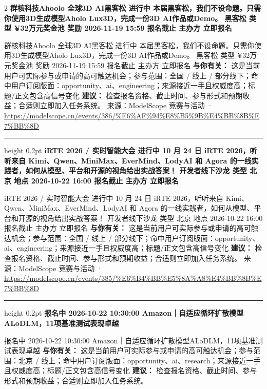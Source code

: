 \documentclass[10.5pt]{ctexart}
\begin{document}
\begin{multicols}{2}
{\large\bfseries 群核科技Ahoolo 全球3D AI黑客松 进行中 本届黑客松，我们不设命题。只需你使用3D生成模型Aholo Lux3D，完成一份3D AI作品或Demo。 黑客松 类型 ¥32万元奖金池 奖励 2026-11-19 15:59 报名截止 主办方 立即报名}\par
群核科技Ahoolo 全球3D AI黑客松 进行中 本届黑客松，我们不设命题。只需你使用3D生成模型Aholo Lux3D，完成一份3D AI作品或Demo。 黑客松 类型 ¥32万元奖金池 奖励 2026-11-19 15:59 报名截止 主办方 立即报名
\textbf{与你有关：} 这是当前用户可实际参与或申请的高可触达机会；参与范围：全国 / 线上 / 部分线下；命中用户订阅版面：opportunity、ai、engineering；来源接近一手且权威度高；标题/正文包含高信号变化
\textbf{建议：} 检查报名资格、截止时间、参与形式和预期收益；合适则立即加入任务系统。
{\footnotesize\color{ormuted} 来源：ModelScope 竞赛与活动 · \url{https://modelscope.cn/events/386/%E6%AF%94%E8%B5%9B%E4%BB%8B%E7%BB%8D}}
\vspace{2mm}
\hrule height 0.2pt
\vspace{2mm}
{\large\bfseries iRTE 2026 / 实时智能大会 进行中 10 月 24 日 iRTE 2026，听听来自 Kimi、Qwen、MiniMax、EverMind、LodyAI 和 Agora 的一线实践者，如何从模型、平台和开源的视角给出实战答案！ 开发者线下沙龙 类型 北京 地点 2026-10-22 16:00 报名截止 主办方 立即报名}\par
iRTE 2026 / 实时智能大会 进行中 10 月 24 日 iRTE 2026，听听来自 Kimi、Qwen、MiniMax、EverMind、LodyAI 和 Agora 的一线实践者，如何从模型、平台和开源的视角给出实战答案！ 开发者线下沙龙 类型 北京 地点 2026-10-22 16:00 报名截止 主办方 立即报名
\textbf{与你有关：} 这是当前用户可实际参与或申请的高可触达机会；参与范围：全国 / 线上 / 部分线下；命中用户订阅版面：opportunity、ai、engineering；来源接近一手且权威度高；标题/正文包含高信号变化
\textbf{建议：} 检查报名资格、截止时间、参与形式和预期收益；合适则立即加入任务系统。
{\footnotesize\color{ormuted} 来源：ModelScope 竞赛与活动 · \url{https://modelscope.cn/events/385/%E6%B4%BB%E5%8A%A8%E4%BB%8B%E7%BB%8D}}
\vspace{2mm}
\hrule height 0.2pt
\vspace{2mm}
{\large\bfseries 报名中 2026-10-22 10:30:00 Amazon｜自适应循环扩散模型ALoDLM，11项基准测试表现卓越}\par
报名中 2026-10-22 10:30:00 Amazon｜自适应循环扩散模型ALoDLM，11项基准测试表现卓越
\textbf{与你有关：} 这是当前用户可实际参与或申请的高可触达机会；参与范围：北京 / 线上；命中用户订阅版面：opportunity、ai、research；来源接近一手且权威度高；标题/正文包含高信号变化
\textbf{建议：} 检查报名资格、截止时间、参与形式和预期收益；合适则立即加入任务系统。

\end{multicols}
\end{document}
